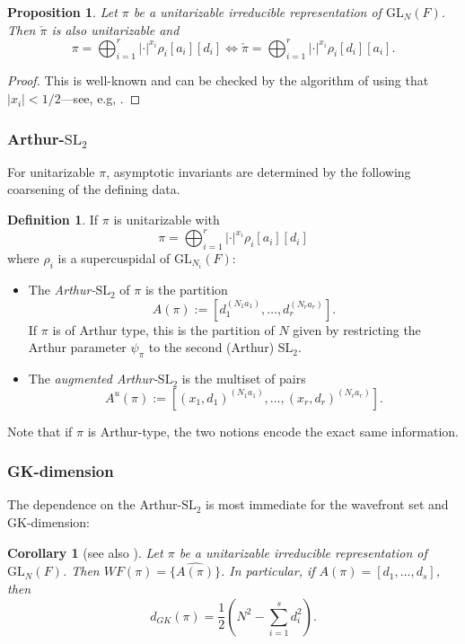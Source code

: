 \documentclass{amsart}
\newcommand{\lf}{\left}
\newcommand{\ri}{\right}
\newcommand{\f}{\frac}
\newcommand{\SL}{\mathrm{SL}}
\newcommand{\GL}{\mathrm{GL}}
\newcommand{\1}{\m 1}
\newtheorem{prop}[thm]{Proposition}
\newtheorem{cor}[thm]{Corollary}
\theoremstyle{remark}
\theoremstyle{definition}
\newtheorem{dfn}[thm]{Definition}
\numberwithin{equation}{subsection}
\begin{document}
\begin{prop}\label{prop:Atypedual}
Let $\pi$ be a unitarizable irreducible representation of $\GL_N(F)$. Then $\check \pi$ is also unitarizable and 
\[
\pi = \bigoplus_{i=1}^r |\cdot|^{x_i} \rho_i[a_i][d_i] \iff \check \pi = \bigoplus_{i=1}^r |\cdot|^{x_i} \rho_i[d_i][a_i].
\]
\end{prop}

\begin{proof}
This is well-known and can be checked by the algorithm of \cite{MW86} using that $|x_i| < 1/2$---see, e.g, \cite[\S3.2]{LM14}.  
\end{proof}

\subsubsection{Arthur-$\SL_2$} For unitarizable $\pi$, asymptotic invariants are determined by the following coarsening of the defining data. 

\begin{dfn}
If $\pi$ is unitarizable with
\[
\pi = \bigoplus_{i=1}^r |\cdot|^{x_i} \rho_i[a_i][d_i]
\]
where $\rho_i$ is a supercuspidal of $\GL_{N_i}(F)$:
\begin{itemize}
\item
The \emph{Arthur-$\SL_2$} of $\pi$ is the partition
\[
A(\pi) := [d_1^{(N_1 a_1)}, \dotsc, d_r^{(N_r a_r)}].  
\]
If $\pi$ is of Arthur type, this is the partition of $N$ given by restricting the Arthur parameter $\psi_\pi$ to the second (Arthur) $\SL_2$.
\item The \emph{augmented Arthur-$\SL_2$} is the multiset of pairs 
\[
A^u(\pi) :=  [(x_1, d_1)^{(N_1 a_1)}, \dotsc, (x_r,d_r)^{(N_r a_r)}].
\]
\end{itemize}
Note that if $\pi$ is Arthur-type, the two notions encode the exact same information.
\end{dfn}



\subsubsection{GK-dimension}
The dependence on the Arthur-$\SL_2$ is most immediate for the wavefront set and GK-dimension:

\begin{cor}[{see also \cite[Thm 1.1]{LS25}}]\label{cor:ASL2toGKdim}
Let $\pi$ be a unitarizable irreducible representation of $\GL_N(F)$. Then $WF(\pi) = \{\widehat{A(\pi)}\}$. In particular, if $A(\pi) = [d_1, \dotsc, d_s]$, then
\[
d_{GK}(\pi) = \f12\lf(N^2 - \sum_{i=1}^s d_i^2\ri). 
\]
\end{cor}
\end{document}
